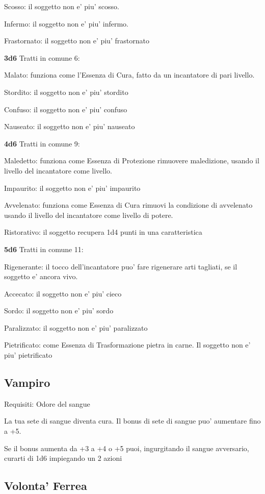 \documentclass[a4paper,11pt,twoside,openany]{dndbook}
\begin{document}
Scosso: il soggetto non e' piu' scosso.

Infermo: il soggetto non e' piu' infermo.

Frastornato: il soggetto non e' piu' frastornato

\textbf{3d6} Tratti in comune 6:

Malato: funziona come l'Essenza di Cura, fatto da un incantatore di pari livello.

Stordito: il soggetto non e' piu' stordito

Confuso: il soggetto non e' piu' confuso

Nauseato: il soggetto non e' piu' nauseato

\textbf{4d6} Tratti in comune 9:

Maledetto: funziona come Essenza di Protezione rimuovere maledizione, usando il livello del incantatore come livello.

Impaurito: il soggetto non e' piu' impaurito

Avvelenato: funziona come Essenza di Cura rimuovi la condizione di avvelenato usando il livello del incantatore come livello di potere.

Ristorativo: il soggetto recupera 1d4 punti in una caratteristica

\textbf{5d6} Tratti in comune 11:

Rigenerante: il tocco dell'incantatore puo' fare rigenerare arti tagliati, se il soggetto e' ancora vivo.

Accecato: il soggetto non e' piu' cieco

Sordo: il soggetto non e' piu' sordo

Paralizzato: il soggetto non e' piu' paralizzato

Pietrificato: come Essenza di Trasformazione pietra in carne. Il soggetto non e' piu' pietrificato

\subsection{Vampiro}

Requisiti: Odore del sangue

La tua sete di sangue diventa cura. Il bonus di sete di sangue puo' aumentare fino a +5.

Se il bonus aumenta da +3 a +4 o +5 puoi, ingurgitando il sangue avversario, curarti di 1d6 impiegando un 2 azioni

\subsection{Volonta' Ferrea}
\end{document}
